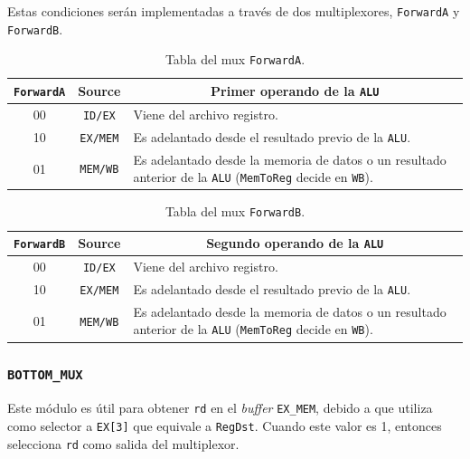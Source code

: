 \documentclass[a4paper]{article}
\begin{document}
\bigskip

Estas condiciones serán implementadas a través de dos multiplexores, \texttt{ForwardA} y \texttt{ForwardB}.

\begin{table}[H]
\centering
\begin{tabular}{|c|c|p{7.5cm}|}
\hline
\texttt{ForwardA} & \textbf{Source} & \multicolumn{1}{c|}{\textbf{Primer operando de la \texttt{ALU}}}                    \\ \hline
00 & \texttt{ID/EX}  & Viene del archivo registro.                        \\ \hline
10 & \texttt{EX/MEM} & Es adelantado desde el resultado previo de la \texttt{ALU}. \\ \hline
01                & \texttt{MEM/WB}          & Es adelantado desde la memoria de datos o un resultado anterior de la \texttt{ALU} (\texttt{MemToReg} decide en \texttt{WB}). \\ \hline
\end{tabular}
\caption{Tabla del mux \texttt{ForwardA}.}
\label{tab:forwardA-table}
\end{table}

\begin{table}[H]
\centering
\begin{tabular}{|c|c|p{7.5cm}|}
\hline
\texttt{ForwardB} & \textbf{Source} & \multicolumn{1}{c|}{\textbf{Segundo operando de la \texttt{ALU}}}                   \\ \hline
00 & \texttt{ID/EX}  & Viene del archivo registro.                        \\ \hline
10 & \texttt{EX/MEM} & Es adelantado desde el resultado previo de la \texttt{ALU}. \\ \hline
01                & \texttt{MEM/WB}          & Es adelantado desde la memoria de datos o un resultado anterior de la \texttt{ALU} (\texttt{MemToReg} decide en \texttt{WB}). \\ \hline
\end{tabular}
\caption{Tabla del mux \texttt{ForwardB}.}
\label{tab:forwardB-table}
\end{table}

\subsubsection{\texttt{BOTTOM\_MUX}} \label{sec:bottom}
Este módulo es útil para obtener \texttt{rd} en el \textit{buffer} \texttt{EX\_MEM}, debido a que utiliza como selector a \texttt{EX[3]} que equivale a \texttt{RegDst}. Cuando este valor es 1, entonces selecciona \texttt{rd} como salida del multiplexor.
\end{document}
